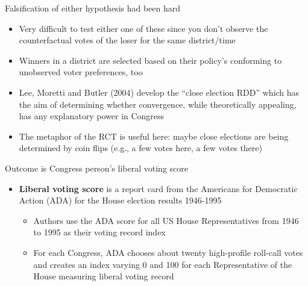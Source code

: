 \documentclass{beamer}
\begin{document}
\begin{frame}{Falsification of either hypothesis had been hard}

\begin{itemize}
\item Very difficult to test either one of these since you don't observe the counterfactual votes of the loser for the same district/time
\item Winners in a district are selected based on their policy's conforming to unobserved voter preferences, too
\item Lee, Moretti and Butler (2004) develop the ``close election RDD'' which has the aim of determining whether convergence, while theoretically appealing, has any explanatory power in Congress
\item The metaphor of the RCT is useful here: maybe close elections are being determined by coin flips (e.g., a few votes here, a few votes there)
\end{itemize}

\end{frame}






\begin{frame}{Outcome is Congress person's liberal voting score}
	
	\begin{itemize}
	\item \textbf{Liberal voting score} is a report card from the Americans for Democratic Action (ADA) for the House election results 1946-1995
		\begin{itemize}
		\item Authors use the ADA score for all US House Representatives from 1946 to 1995 as their voting record index
		\item For each Congress, ADA chooses about twenty high-profile roll-call votes and creates an index varying 0 and 100 for each Representative of the House measuring liberal voting record
		\end{itemize}
	\end{itemize}
\end{frame}
\end{document}
